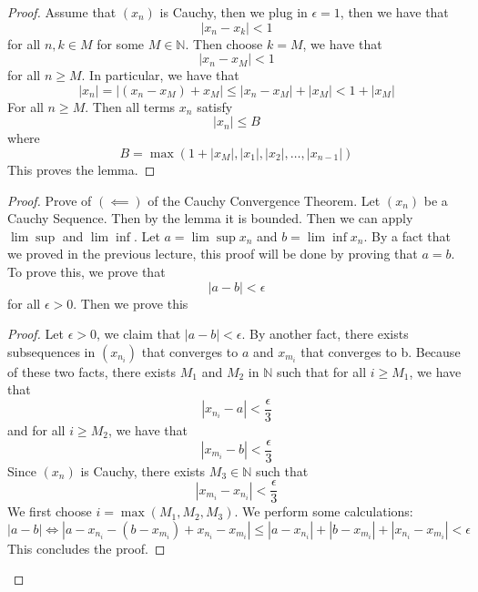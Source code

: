 \documentclass{article}
\newtheorem{one minute paper}[theorem]{One Minute Paper}
\begin{document}
\begin{proof}
    Assume that $(x_n)$ is Cauchy, then we plug in $\epsilon = 1$, then we have that 
    \begin{equation}
        |x_n - x_k| < 1
    \end{equation}
    for all $n, k \in M$ for some $M \in \mathbb{N}$. Then choose $k = M$, we have that 
    \begin{equation}
        |x_n - x_M| < 1
    \end{equation}
    for all $n \geq M$. In particular, we have that 
    \begin{equation}
        |x_n| = |(x_n - x_M) + x_M| \leq |x_n - x_M| + |x_M| < 1 + |x_M|
    \end{equation}
    For all $n \geq M$. Then all terms $x_n$ satisfy 
    \begin{equation}
        |x_n| \leq B
    \end{equation}
    where
    \begin{equation}
        B = \max(1 + |x_M|, |x_1|, |x_2|, \ldots, |x_{n-1}|)
    \end{equation}
    This proves the lemma. 
\end{proof}

\begin{proof}
    Prove of $(\impliedby)$ of the Cauchy Convergence Theorem. Let $(x_n)$ be a Cauchy Sequence. Then by the lemma it is bounded. Then we can apply $\lim \sup$ and $\lim \inf$. Let $a = \lim \sup x_n$ and $b = \lim \inf x_n$.
    By a fact that we proved in the previous lecture, this proof will be done by proving that $a = b$. To prove this, we prove that 
    \begin{equation}
        |a - b| < \epsilon
    \end{equation}
    for all $\epsilon > 0$. 
    Then we prove this
    \begin{proof}
        Let $\epsilon > 0$, we claim that $|a - b| < \epsilon$. By another fact, there exists subsequences in $(x_{n_i})$ that converges to $a$ and $x_{m_i}$ that converges to b. Because of these two facts, there exists $M_1$ and $M_2$ in $\mathbb{N}$ such that for all $i \geq M_1$, we have that 
        \begin{equation}
            |x_{n_i} - a| < \frac{\epsilon}{3}
        \end{equation}
        and for all $i \geq M_2$, we have that 
        \begin{equation}
            |x_{m_i} - b| < \frac{\epsilon}{3}
        \end{equation}
        Since $(x_n)$ is Cauchy, there exists $M_3 \in \mathbb{N}$ such that 
        \begin{equation}
            |x_{m_i} - x_{n_i}| < \frac{\epsilon}{3}
        \end{equation}
        We first choose $i = \max(M_1, M_2, M_3)$. We perform some calculations:
        \begin{equation}
            |a - b| \iff |a - x_{n_i} - (b - x_{m_i}) + x_{n_i} - x_{m_i}| \leq |a - x_{n_i}| + |b - x_{m_i}| + |x_{n_i} - x_{m_i}| < \epsilon
        \end{equation}
        This concludes the proof. 
    \end{proof}
\end{proof}
\end{document}
